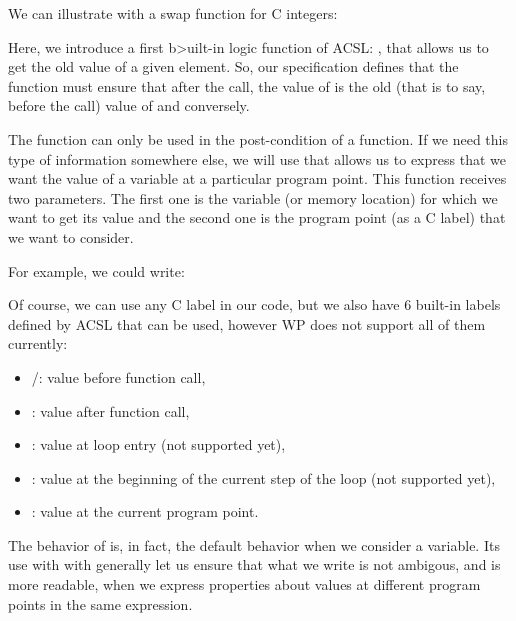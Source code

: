 We can illustrate with a swap function for C integers:








Here, we introduce a first b>uilt-in logic function of ACSL:
, that allows us to get the old value of a given element.
So, our specification defines that the function must ensure that after
the call, the value of  is the old (that is to say, before
the call) value of  and conversely.

The  function can only be used in the
post-condition of a function. If we need this type of information
somewhere else, we will use  that allows us to express that
we want the value of a variable at a particular program point. This
function receives two parameters. The first one is the variable (or
memory location) for which we want to get its value and the second one
is the program point (as a C label) that we want to consider.

For example, we could write:






Of course, we can use any C label in our code, but we also have 6
built-in labels defined by ACSL that can be used, however WP does not
support all of them currently:



\begin{itemize}
\item {}/: value before function call,
\item {}: value after function call,
\item {}: value at loop entry (not supported yet),
\item {}: value at the beginning of the current step of
  the loop (not supported yet),
\item {}: value at the current program point.
\end{itemize}


\begin{Information}
  The behavior of  is, in fact, the default behavior when we
  consider a variable. Its use with  with
  generally let us ensure that what we write is not ambigous, and is more
  readable, when we express properties about values at different program
  points in the same expression.
\end{Information}


